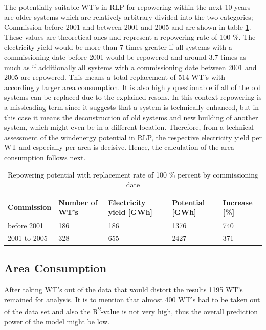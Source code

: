 \documentclass[a4paper,11pt]{article}
\begin{document}
The potentially suitable WT's in RLP for repowering within the next 10 years are older systems which are relatively arbitrary divided into the two categories; Commission before 2001 and between 2001 and 2005 and are shown in table \ref{tab:table1}. These values are theoretical ones and represent a repowering rate of 100 \%. The electricity yield would be more than 7 times greater if all systems with a commissioning date before 2001 would be repowered and around 3.7 times as much as if additionally all systems with a commissioning date between 2001 and 2005 are repowered. This means a total replacement of 514 WT's with accordingly larger area consumption. It is also highly questionable if all of the old systems can be replaced due to the explained resons. In this context repowering is a missleading term since it suggests that a system is technically enhanced, but in this case it means the deconstruction of old systems and new building of another system, which might even be in a different location. Therefore, from a technical assessment of the windenergy potential in RLP, the respective electricity yield per WT and especially per area is decisive. Hence, the calculation of the area consumption follows next.
\begin{table}[H]

\caption{\label{tab:table1}Repowering potential with replacement rate of 100 \% percent by 
  commissioning date}
\centering
\begin{tabular}[t]{lllll}
\toprule
Commission & Number of WT's & Electricity yield [GWh] & Potential [GWh] & Increase [\%]\\
\midrule
before 2001 & 186 & 186 & 1376 & 740\\
2001 to 2005 & 328 & 655 & 2427 & 371\\
\midrule
\bottomrule
\end{tabular}
\end{table}
\hypertarget{area-consumption}{%
\subsection{Area Consumption}\label{area-consumption}}

After taking WT's out of the data that would distort the results 1195 WT's remained for analysis. It is to mention that almost 400 WT's had to be taken out of the data set and also the R\textsuperscript{2}-value is not very high, thus the overall prediction power of the model might be low.
\end{document}

